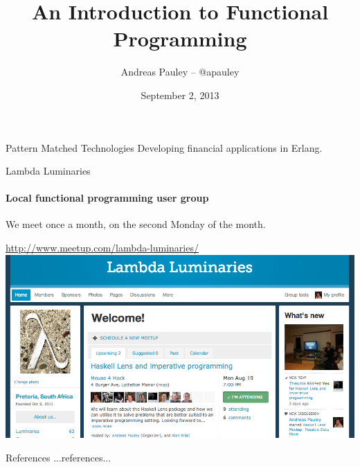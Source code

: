 \documentclass{beamer}
\title[Functional Programming]{An Introduction to Functional Programming}
\author{Andreas Pauley -- @apauley}
\institute{Pattern Matched Technologies\\Lambda Luminaries}
\date{September 2, 2013}
\begin{document}
\begin{frame}
\titlepage
\end{frame}


\begin{frame}{Pattern Matched Technologies}
Developing financial applications in Erlang.
\end{frame}

\begin{frame}{Lambda Luminaries}
\framesubtitle{Local functional programming user group}
We meet once a month, on the second Monday of the month.

\url{http://www.meetup.com/lambda-luminaries/}
\includegraphics[scale=0.3]{img/LambdaLuminariesScreenShot2013-08-09.png}

\end{frame}

\begin{frame}{References}
...references...
\end{frame}
\end{document}
